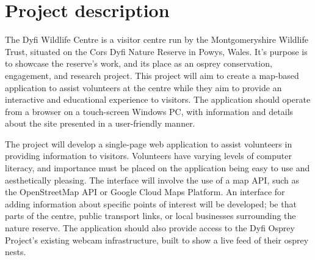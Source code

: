 \documentclass[11pt,fleqn,twoside]{article}
\begin{document}

\mmp



\section{Project description}

The Dyfi Wildlife Centre is a visitor centre run by the Montgomeryshire Wildlife Trust, situated on the Cors Dyfi Nature Reserve in Powys, Wales. It's purpose is to showcase the reserve's work, and its place as an osprey conservation, engagement, and research project\cite{DyfiWildlifeCentre}. This project will aim to create a map-based application to assist volunteers at the centre while they aim to provide an interactive and educational experience to visitors. The application should operate from a browser on a touch-screen Windows PC, with information and details about the site presented in a user-friendly manner.

The project will develop a single-page web application to assist volunteers in providing information to visitors. Volunteers have varying levels of computer literacy, and importance must be placed on the application being easy to use and aesthetically pleasing. The interface will involve the use of a map API, such as the OpenStreetMap API\cite{OSM} or Google Cloud Maps Platform\cite{GoogleMapsPlatform}. An interface for adding information about specific points of interest will be developed; be that parts of the centre, public transport links, or local businesses surrounding the nature reserve. The application should also provide access to the Dyfi Osprey Project's existing webcam infrastructure, built to show a live feed of their osprey nests.
\end{document}
